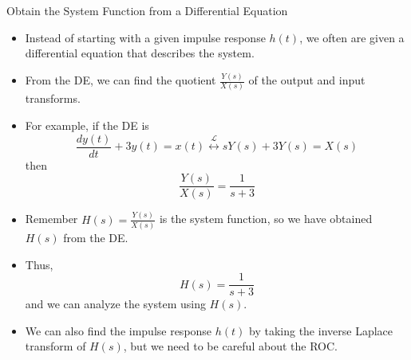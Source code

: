\begin{frame}[t]{Obtain the System Function from a Differential Equation}
  \small
  \begin{itemize}
    \item Instead of starting with a given impulse response $h(t)$, we often are given a differential equation that describes the system.
    \item From the DE, we can find the quotient $\frac{Y(s)}{X(s)}$ of the output and input transforms.
    \item For example, if the DE is
      \[
        \frac{dy(t)}{dt}+3y(t)=x(t) \stackrel{\mathcal{L}}{\longleftrightarrow} sY(s)+3Y(s)=X(s)
      \]
      then
      \[
        \frac{Y(s)}{X(s)}=\frac{1}{s+3}
      \]
    \item Remember $H(s) = \frac{Y(s)}{X(s)}$ is the system function, so we have obtained $H(s)$ from the DE.
    \item Thus,
      \[
        H(s) = \frac{1}{s+3}
      \]
      and we can analyze the system using $H(s)$.
    \item We can also find the impulse response $h(t)$ by taking the inverse Laplace transform of $H(s)$, but we need to be careful about the ROC.
  \end{itemize}
\end{frame}

